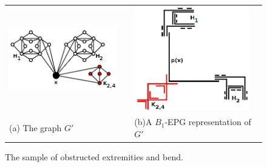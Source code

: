 \begin{figure}[h]
  \centering
  \begin{tabular}{p{6cm} p{1cm} p{6cm}}
     \includegraphics[width=5cm, center]{./img/grafoDobraExtremidadeObstruida2.png} &  &\includegraphics[width=5cm, center]{./img/extremidadeDobraObstruida3.png}  \\%
    \footnotesize \centering (a) The graph $G'$& & \footnotesize \centering (b)A $B_1$-EPG representation of $G'$%
  \end{tabular}
 \caption{The sample of  obstructed extremities and bend.}\label{fig:extremidadeDobraObstruida}
\end{figure}